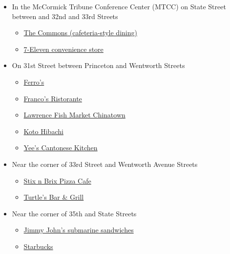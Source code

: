 \begin{itemize}
	\item In the McCormick Tribune Conference Center (MTCC) on State Street between and 32nd and 33rd Streets
	\begin{itemize}
		\item \href{https://dineoncampus.com/iit/hours-of-operation}{The Commons (cafeteria-style dining)}
		\item \href{https://www.yelp.com/biz/7-eleven-chicago-12}{7-Eleven convenience store}
	\end{itemize}
	\item On 31st Street between Princeton and Wentworth Streets
	\begin{itemize}
		\item \href{https://www.yelp.com/biz/ferros-chicago}{Ferro's}
		\item \href{https://www.francoschicago.com/}{Franco's Ristorante}
		\item \href{https://ct.lawrencefish.com/}{Lawrence Fish Market Chinatown}
		\item \href{https://kotohibachichicago.com/}{Koto Hibachi}
		\item \href{https://www.yelp.com/biz/yees-cantonese-kitchen-chicago-2}{Yee's Cantonese Kitchen}
	\end{itemize}
		\item Near the corner of 33rd Street and Wentworth Avenue Streets
	\begin{itemize}
		\item \href{https://stixnbrix33.com/}{Stix n Brix Pizza Cafe}
		\item \href{https://www.yelp.com/biz/turtles-bar-and-grill-chicago}{Turtle's Bar \& Grill}
	\end{itemize}

	\item Near the corner of 35th and State Streets
	\begin{itemize}
		\item \href{https://www.yelp.com/biz/jimmy-johns-chicago-22}{Jimmy John's submarine sandwiches}
		\item \href{https://www.yelp.com/biz/starbucks-chicago-113}{Starbucks}
	\end{itemize}


\end{itemize}





